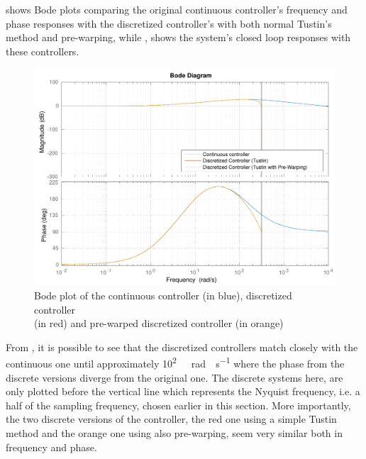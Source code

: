  shows Bode plots comparing the original continuous controller's frequency and phase responses with the discretized controller's with both normal Tustin's method and pre-warping, while , shows the system's closed loop responses with these controllers.\\ 
% 
\begin{figure}[H]
  \centering
  \includegraphics[scale=0.67]{figures/prewarpVsNoPrewarpVsContinuousBode.pdf}
  \caption{Bode plot of the continuous controller (in blue), discretized controller\\(in red) and pre-warped discretized controller (in orange)}
  \label{fig:bodePrewarpVsNoPrewarpVsContinuous}
\end{figure}
%
From , it is possible to see that the discretized controllers match closely with the continuous one until approximately \si{10^{2}\ rad \cdot s^{-1}} where the phase from the discrete versions diverge from the original one. The discrete systems here, are only plotted before the vertical line which represents the Nyquist frequency, i.e. a half of the sampling frequency, chosen earlier in this section. More importantly, the two discrete versions of the controller, the red one using a simple Tustin method and the orange one using also pre-warping, seem very similar both in frequency and phase.
%
